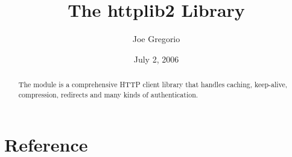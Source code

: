\documentclass{manual}
\title{The httplib2 Library}
\author{Joe Gregorio}
\date{July 2, 2006}       %
\begin{document}
\maketitle


%

\begin{abstract}
\noindent

The  module is a comprehensive HTTP client library
that handles caching, keep-alive, compression, redirects and
many kinds of authentication.


\end{abstract}

\tableofcontents

\chapter{Reference}













%
%
%
\renewcommand{\indexname}{Module Index}

\renewcommand{\indexname}{Index}
\end{document}
